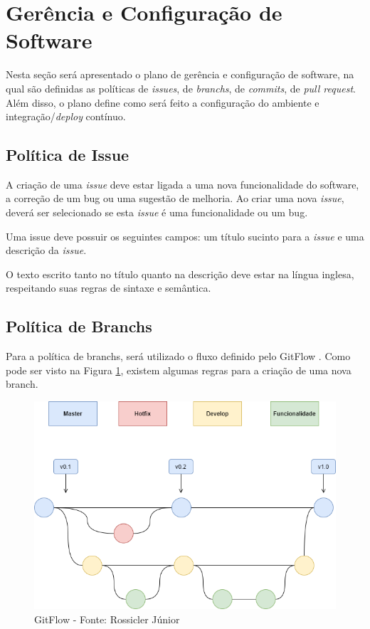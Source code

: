 {\color{textadded}
\section{Gerência e Configuração de Software}
\label{sec:gces}

Nesta seção será apresentado o plano de gerência e configuração de software, na qual são definidas as políticas de \textit{issues}, de \textit{branchs}, de \textit{commits}, de \textit{pull request}. Além disso, o plano define como será feito a configuração do ambiente e integração/\textit{deploy} contínuo.

\subsection{Política de Issue}
\label{ssec:politica_issue}

A criação de uma \textit{issue} deve estar ligada a uma nova funcionalidade do software, a correção de um bug ou uma sugestão de melhoria. Ao criar uma nova \textit{issue}, deverá ser selecionado se esta \textit{issue} é uma funcionalidade ou um bug.

Uma issue deve possuir os seguintes campos: um título sucinto para a \textit{issue} e uma descrição da \textit{issue}.

O texto escrito tanto no título quanto na descrição deve estar na língua inglesa, respeitando suas regras de sintaxe e semântica.

\subsection{Política de Branchs}

Para a política de branchs, será utilizado o fluxo definido pelo GitFlow \cite{dwaraki2015gitflow}. Como pode ser visto na Figura \ref{Fig:gitflow.png}, existem algumas regras para a criação de uma nova branch.

\newpage

\begin{figure}[htbp]
	\centering
		\includegraphics[keepaspectratio=true,scale=0.50]{figuras/gces/git_flow.png}
	\caption{{\color{textadded}GitFlow - Fonte: Rossicler Júnior}}
	\label{Fig:gitflow.png}
\end{figure}

}
